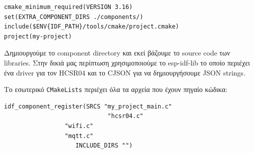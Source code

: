 \begin{lstlisting}
cmake_minimum_required(VERSION 3.16)
set(EXTRA_COMPONENT_DIRS ./components/)
include($ENV{IDF_PATH}/tools/cmake/project.cmake)
project(my-project)
\end{lstlisting}

Δημιουργούμε το component directory και εκεί βάζουμε το source code των
libraries. Στην δικιά μας περίπτωση χρησιμοποιούμε το esp-idf-lib το οποίο
περιέχει ένα driver για τον HCSR04 και το CJSON για να δημιουργήσουμε JSON
strings.

Το εσωτερικό \verb|CMakeLists| περιέχει όλα τα αρχεία που έχουν
πηγαίο κώδικα:

\begin{lstlisting}
idf_component_register(SRCS "my_project_main.c"
                             "hcsr04.c"
			     "wifi.c"
			     "mqtt.c"
                    INCLUDE_DIRS "")
\end{lstlisting}

